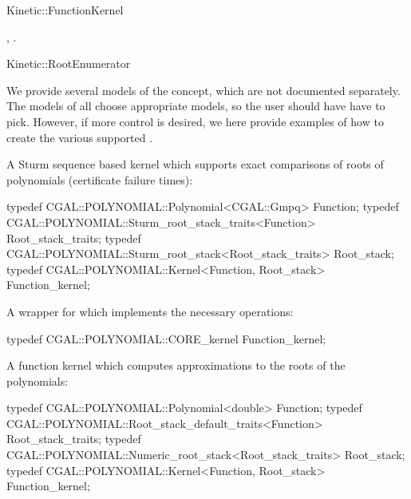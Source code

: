 \begin{ccRefConcept}{Kinetic::FunctionKernel}









\ccHasModels
{}, .

\ccSeeAlso

Kinetic::RootEnumerator

\ccExample

We provide several models of the concept, which are not documented
separately. The models of  all choose
appropriate models, so the user should have have to pick.  However, if
more control is desired, we here provide examples of how to create the
various supported .

A Sturm sequence based kernel which supports exact comparisons of roots of polynomials (certificate failure times):
\begin{ccExampleCode}
typedef CGAL::POLYNOMIAL::Polynomial<CGAL::Gmpq> Function;
typedef CGAL::POLYNOMIAL::Sturm_root_stack_traits<Function> Root_stack_traits;
typedef CGAL::POLYNOMIAL::Sturm_root_stack<Root_stack_traits> Root_stack;
typedef CGAL::POLYNOMIAL::Kernel<Function, Root_stack> Function_kernel;
\end{ccExampleCode}

A wrapper for  which implements the necessary
operations:
\begin{ccExampleCode}
  typedef CGAL::POLYNOMIAL::CORE_kernel Function_kernel;
\end{ccExampleCode}

A function kernel which computes approximations to the roots of the polynomials:
\begin{ccExampleCode}
typedef CGAL::POLYNOMIAL::Polynomial<double> Function;
typedef CGAL::POLYNOMIAL::Root_stack_default_traits<Function> Root_stack_traits;
typedef CGAL::POLYNOMIAL::Numeric_root_stack<Root_stack_traits> Root_stack;
typedef CGAL::POLYNOMIAL::Kernel<Function, Root_stack> Function_kernel;
\end{ccExampleCode}


\end{ccRefConcept}
